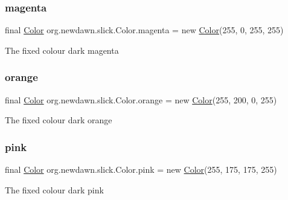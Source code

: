 \subsubsection{\texorpdfstring{magenta}{magenta}}
{\footnotesize\ttfamily final \mbox{\hyperlink{classorg_1_1newdawn_1_1slick_1_1_color}{Color}} org.\+newdawn.\+slick.\+Color.\+magenta = new \mbox{\hyperlink{classorg_1_1newdawn_1_1slick_1_1_color}{Color}}(255, 0, 255, 255)\hspace{0.3cm}{\ttfamily [static]}}

The fixed colour dark magenta \mbox{\label{classorg_1_1newdawn_1_1slick_1_1_color_a5e08f313b06661c5d50b11456bd2b3c7}} 
\subsubsection{\texorpdfstring{orange}{orange}}
{\footnotesize\ttfamily final \mbox{\hyperlink{classorg_1_1newdawn_1_1slick_1_1_color}{Color}} org.\+newdawn.\+slick.\+Color.\+orange = new \mbox{\hyperlink{classorg_1_1newdawn_1_1slick_1_1_color}{Color}}(255, 200, 0, 255)\hspace{0.3cm}{\ttfamily [static]}}

The fixed colour dark orange \mbox{\label{classorg_1_1newdawn_1_1slick_1_1_color_a08fa04ac09bbd960dffd1dd1d23a3831}} 
\subsubsection{\texorpdfstring{pink}{pink}}
{\footnotesize\ttfamily final \mbox{\hyperlink{classorg_1_1newdawn_1_1slick_1_1_color}{Color}} org.\+newdawn.\+slick.\+Color.\+pink = new \mbox{\hyperlink{classorg_1_1newdawn_1_1slick_1_1_color}{Color}}(255, 175, 175, 255)\hspace{0.3cm}{\ttfamily [static]}}

The fixed colour dark pink \mbox{\label{classorg_1_1newdawn_1_1slick_1_1_color_ac07fa95108064b044dcf9a53e95dcb48}} 
